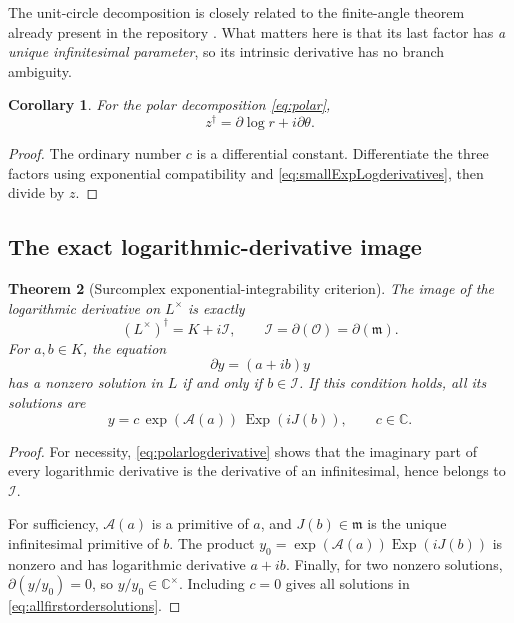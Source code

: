 \documentclass[11pt]{article}
\numberwithin{equation}{section}
\newtheorem{theorem}{Theorem}[section]
\newtheorem{corollary}[theorem]{Corollary}
\theoremstyle{definition}
\newcommand{\C}{\mathbb C}
\newcommand{\OO}{\mathcal O}
\newcommand{\mm}{\mathfrak m}
\newcommand{\II}{\mathcal I}
\newcommand{\DD}{\partial}
\newcommand{\Prim}{\mathcal A}
\newcommand{\Exp}{\operatorname{Exp}}
\begin{document}
The unit-circle decomposition is closely related to the finite-angle
theorem already present in the repository \cite{RepoTrig}. What matters
here is that its last factor has \emph{a unique infinitesimal parameter},
so its intrinsic derivative has no branch ambiguity.

\begin{corollary}\label{cor:polarlogderivative}
For the polar decomposition \eqref{eq:polar},
\begin{equation}\label{eq:polarlogderivative}
 z^\dagger=\DD\log r+i\DD\theta.
\end{equation}
\end{corollary}
\begin{proof}
The ordinary number $c$ is a differential constant. Differentiate the
three factors using exponential compatibility and
\eqref{eq:smallExpLogderivatives}, then divide by $z$.
\end{proof}

\subsection{The exact logarithmic-derivative image}
\begin{theorem}[Surcomplex exponential-integrability criterion]
\label{thm:logderivativeimage}
The image of the logarithmic derivative on $L^\times$ is exactly
\begin{equation}\label{eq:logderivativeimage}
 (L^\times)^\dagger=K+i\II,
 \qquad \II=\DD(\OO)=\DD(\mm).
\end{equation}
For $a,b\in K$, the equation
\begin{equation}\label{eq:firstorder}
 \DD y=(a+ib)y
\end{equation}
has a nonzero solution in $L$ if and only if $b\in\II$. If this
condition holds, all its solutions are
\begin{equation}\label{eq:allfirstordersolutions}
 y=c\,\exp(\Prim(a))\,\Exp(iJ(b)),\qquad c\in\C.
\end{equation}
\end{theorem}
\begin{proof}
For necessity, \eqref{eq:polarlogderivative} shows that the imaginary
part of every logarithmic derivative is the derivative of an
infinitesimal, hence belongs to $\II$.

For sufficiency, $\Prim(a)$ is a primitive of $a$, and $J(b)\in\mm$
is the unique infinitesimal primitive of $b$. The product
$y_0=\exp(\Prim(a))\Exp(iJ(b))$ is nonzero and has logarithmic
derivative $a+ib$. Finally, for two nonzero solutions,
$\DD(y/y_0)=0$, so $y/y_0\in\C^\times$. Including $c=0$ gives
all solutions in \eqref{eq:allfirstordersolutions}.
\end{proof}
\end{document}

